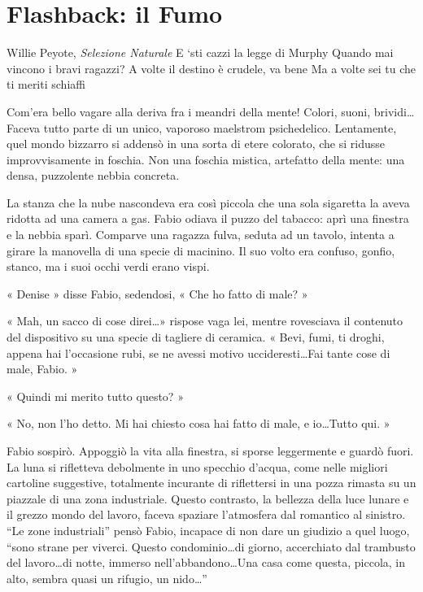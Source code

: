 \chapter{Flashback: il Fumo}

\begin{chapquote}{Willie Peyote, \textit{Selezione Naturale}}
	E `sti cazzi la legge di Murphy\newline
	Quando mai vincono i bravi ragazzi?\newline
	A volte il destino è crudele, va bene\newline
	Ma a volte sei tu che ti meriti schiaffi
\end{chapquote}


Com'era bello vagare alla deriva fra i meandri della mente! Colori, suoni, brividi\ldots Faceva tutto parte di un unico, vaporoso maelstrom psichedelico. Lentamente, quel mondo bizzarro si addensò in una sorta di etere colorato, che si ridusse improvvisamente in foschia. Non una foschia mistica, artefatto della mente: una densa, puzzolente nebbia concreta.

La stanza che la nube nascondeva era così piccola che una sola sigaretta la aveva ridotta ad una camera a gas. Fabio odiava il puzzo del tabacco: aprì una finestra e la nebbia sparì. Comparve una ragazza fulva, seduta ad un tavolo, intenta a girare la manovella di una specie di macinino. Il suo volto era confuso, gonfio, stanco, ma i suoi occhi verdi erano vispi.

« Denise » disse Fabio, sedendosi, « Che ho fatto di male? »

« Mah, un sacco di cose direi\ldots » rispose vaga lei, mentre rovesciava il contenuto del dispositivo su una specie di tagliere di ceramica. « Bevi, fumi, ti droghi, appena hai l'occasione rubi, se ne avessi motivo uccideresti\ldots Fai tante cose di male, Fabio. »

« Quindi mi merito tutto questo? »

« No, non l'ho detto. Mi hai chiesto cosa hai fatto di male, e io\ldots Tutto qui. »

Fabio sospirò. Appoggiò la vita alla finestra, si sporse leggermente e guardò fuori. La luna si rifletteva debolmente in uno specchio d'acqua, come nelle migliori cartoline suggestive, totalmente incurante di riflettersi in una pozza rimasta su un piazzale di una zona industriale. Questo contrasto, la bellezza della luce lunare e il grezzo mondo del lavoro, faceva spaziare l'atmosfera dal romantico al sinistro. ``Le zone industriali'' pensò Fabio, incapace di non dare un giudizio a quel luogo, ``sono strane per viverci. Questo condominio\ldots di giorno, accerchiato dal trambusto del lavoro\ldots di notte, immerso nell'abbandono\ldots Una casa come questa, piccola, in alto, sembra quasi un rifugio, un nido\ldots''

